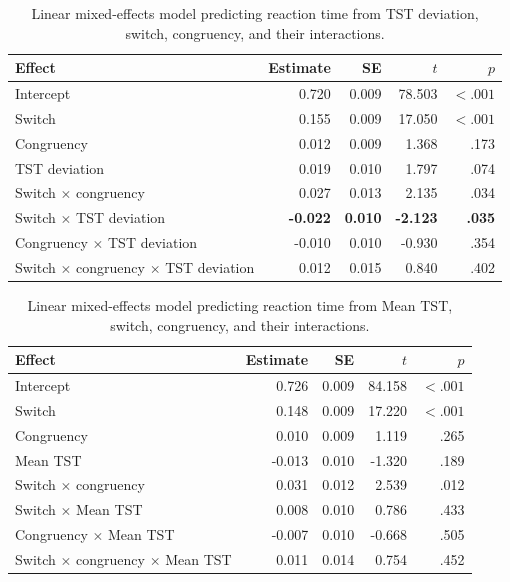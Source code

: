\documentclass[12pt,a4paper]{report}
\begin{document}
\begin{appendices}
\begin{table}[H]
\centering
\small
\caption{Linear mixed-effects model predicting reaction time from TST deviation, switch, congruency, and their interactions.}
\label{tab:app_rt_tstdev}
\begin{tabularx}{\textwidth}{Xrrrr}
\toprule
Effect & Estimate & SE & $t$ & $p$ \\
\midrule
Intercept & 0.720 & 0.009 & 78.503 & $< .001$ \\
Switch & 0.155 & 0.009 & 17.050 & $< .001$ \\
Congruency & 0.012 & 0.009 & 1.368 & .173 \\
TST deviation & 0.019 & 0.010 & 1.797 & .074 \\
Switch $\times$ congruency & 0.027 & 0.013 & 2.135 & .034 \\
Switch $\times$ TST deviation & \textbf{-0.022} & \textbf{0.010} & \textbf{-2.123} & \textbf{.035} \\
Congruency $\times$ TST deviation & -0.010 & 0.010 & -0.930 & .354 \\
Switch $\times$ congruency $\times$ TST deviation & 0.012 & 0.015 & 0.840 & .402 \\
\bottomrule
\end{tabularx}
\end{table}

\begin{table}[H]
\centering
\small
\caption{Linear mixed-effects model predicting reaction time from Mean TST, switch, congruency, and their interactions.}
\label{tab:app_rt_meantst}
\begin{tabularx}{\textwidth}{Xrrrr}
\toprule
Effect & Estimate & SE & $t$ & $p$ \\
\midrule
Intercept & 0.726 & 0.009 & 84.158 & $< .001$ \\
Switch & 0.148 & 0.009 & 17.220 & $< .001$ \\
Congruency & 0.010 & 0.009 & 1.119 & .265 \\
Mean TST & -0.013 & 0.010 & -1.320 & .189 \\
Switch $\times$ congruency & 0.031 & 0.012 & 2.539 & .012 \\
Switch $\times$ Mean TST & 0.008 & 0.010 & 0.786 & .433 \\
Congruency $\times$ Mean TST & -0.007 & 0.010 & -0.668 & .505 \\
Switch $\times$ congruency $\times$ Mean TST & 0.011 & 0.014 & 0.754 & .452 \\
\bottomrule
\end{tabularx}
\end{table}


\end{appendices}
\end{document}
